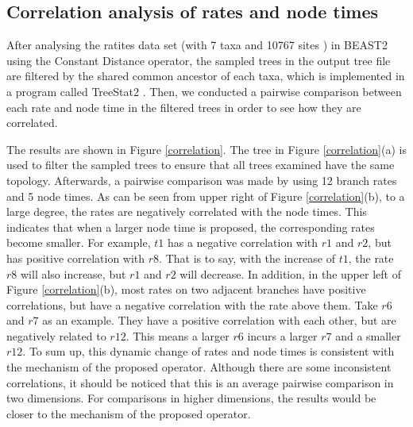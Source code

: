 \documentclass{bmcart}
\begin{document}

\subsection*{Correlation analysis of rates and node times}
After analysing the ratites data set (with 7 taxa and 10767 sites \cite{cooper2001complete}) in BEAST2 using the Constant Distance operator, the sampled trees in the output tree file are filtered by the shared common ancestor of each taxa, which is implemented in a program called TreeStat2 \cite{TreeStat2}. Then, we conducted a pairwise comparison between each rate and node time in the filtered trees in order to see how they are correlated.

The results are shown in Figure \ref{correlation}. The tree in Figure \ref{correlation}(a) is used to filter the sampled trees to ensure that all trees examined have the same topology. Afterwards, a pairwise comparison was made by using 12 branch rates and 5 node times. As can be seen from upper right of Figure \ref{correlation}(b), to a large degree, the rates are negatively correlated with the node times. This indicates that when a larger node time is proposed, the corresponding rates become smaller. For example, $t1$ has a negative correlation with $r1$ and $r2$, but has positive correlation with $r8$. That is to say, with the increase of $t1$, the rate $r8$ will also increase, but $r1$ and $r2$ will decrease. In addition, in the upper left of Figure \ref{correlation}(b), most rates on two adjacent branches have positive correlations, but have a negative correlation with the rate above them. Take $r6$ and $r7$ as an example. They have a positive correlation with each other, but are negatively related to $r12$. This means a larger $r6$ incurs a larger $r7$ and a smaller $r12$. To sum up, this dynamic change of rates and node times is consistent with the mechanism of the proposed operator. Although there are some inconsistent correlations, it should be noticed that this is an average pairwise comparison in two dimensions. For comparisons in higher dimensions, the results would be closer to the mechanism of the proposed operator.
\end{document}

